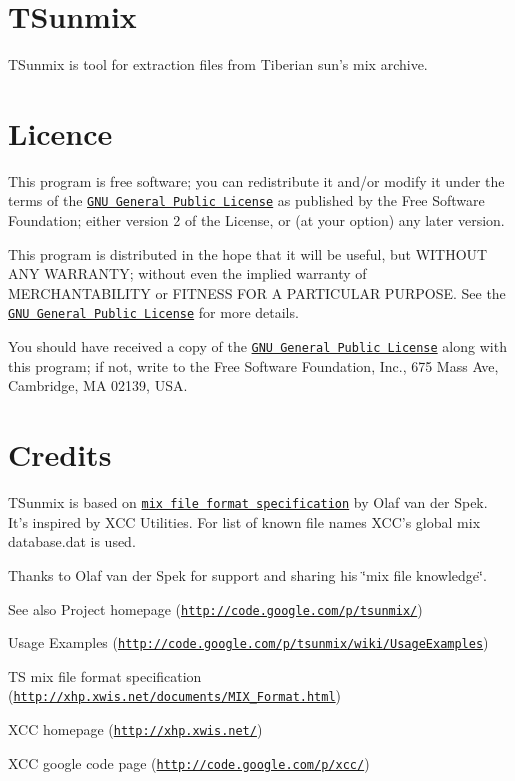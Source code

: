 \hypertarget{index_About}{}\section{TSunmix}\label{index_About}
TSunmix is tool for extraction files from Tiberian sun's mix archive.\hypertarget{index_Licence}{}\section{Licence}\label{index_Licence}
This program is free software; you can redistribute it and/or modify it under the terms of the \href{http://www.gnu.org/licenses/gpl.html}{\tt GNU General Public License} as published by the Free Software Foundation; either version 2 of the License, or (at your option) any later version.

This program is distributed in the hope that it will be useful, but WITHOUT ANY WARRANTY; without even the implied warranty of MERCHANTABILITY or FITNESS FOR A PARTICULAR PURPOSE. See the \href{http://www.gnu.org/licenses/gpl.html}{\tt GNU General Public License} for more details.

You should have received a copy of the \href{http://www.gnu.org/licenses/gpl.html}{\tt GNU General Public License} along with this program; if not, write to the Free Software Foundation, Inc., 675 Mass Ave, Cambridge, MA 02139, USA.\hypertarget{index_Credits}{}\section{Credits}\label{index_Credits}
TSunmix is based on \href{http://xhp.xwis.net/documents/MIX_Format.html}{\tt mix file format specification} by Olaf van der Spek. It's inspired by XCC Utilities. For list of known file names XCC's global mix database.dat is used.

Thanks to Olaf van der Spek for support and sharing his \char`\"{}mix file knowledge\char`\"{}.

\begin{DoxySeeAlso}{See also}
Project homepage (\href{http://code.google.com/p/tsunmix/}{\tt http://code.google.com/p/tsunmix/}) 

Usage Examples (\href{http://code.google.com/p/tsunmix/wiki/UsageExamples}{\tt http://code.google.com/p/tsunmix/wiki/UsageExamples}) 

TS mix file format specification (\href{http://xhp.xwis.net/documents/MIX_Format.html}{\tt http://xhp.xwis.net/documents/MIX\_\-Format.html}) 

XCC homepage (\href{http://xhp.xwis.net/}{\tt http://xhp.xwis.net/}) 

XCC google code page (\href{http://code.google.com/p/xcc/}{\tt http://code.google.com/p/xcc/}) 
\end{DoxySeeAlso}
